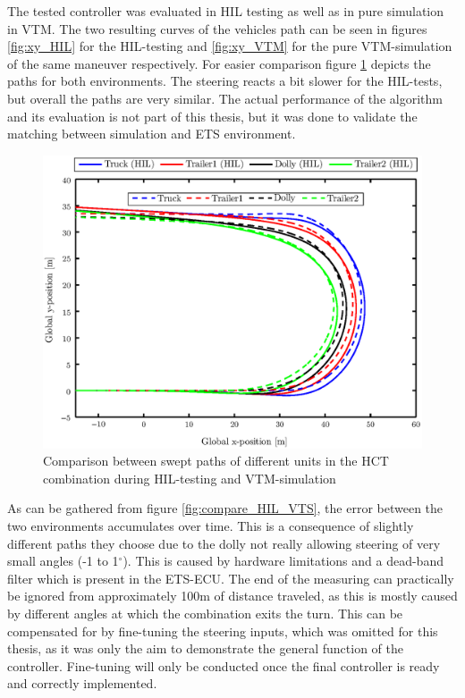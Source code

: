 \documentclass[ExampleMasters.tex]{subfiles}
\begin{document}
The tested controller was evaluated in \gls{HIL} testing as well as in pure simulation in \gls{VTM}. The two resulting curves of the vehicles path can be seen in figures \ref{fig:xy_HIL} for the \gls{HIL}-testing and \ref{fig:xy_VTM} for the pure \gls{VTM}-simulation of the same maneuver respectively. For easier comparison figure \ref{fig:xy_HIL_and_VTM} depicts the paths for both environments. The steering reacts a bit slower for the \gls{HIL}-tests, but overall the paths are very similar. The actual performance of the algorithm and its evaluation is not part of this thesis, but it was done to validate the matching between simulation and \gls{ETS} environment.


\begin{figure}[!htb]
	\centering
	\includegraphics[width=1\linewidth]{figures/xy_HIL_and_VTM}
	\caption{Comparison between swept paths of different units in the \gls{HCT} combination during \gls{HIL}-testing and \gls{VTM}-simulation}
	
	\label{fig:xy_HIL_and_VTM}
\end{figure}

As can be gathered from figure \ref{fig:compare_HIL_VTS}, the error between the two environments accumulates over time. This is a consequence of slightly different paths they choose due to the dolly not really allowing steering of very small angles (-1 to 1$^\circ$). This is caused by hardware limitations and a dead-band filter which is present in the \gls{ETS}-\gls{ECU}. The end of the measuring can practically be ignored from approximately 100m of distance traveled, as this is mostly caused by different angles at which the combination exits the turn. This can be compensated for by fine-tuning the steering inputs, which was omitted for this thesis, as it was only the aim to demonstrate the general function of the controller. Fine-tuning will only be conducted once the final controller is ready and correctly implemented. 
\end{document}
